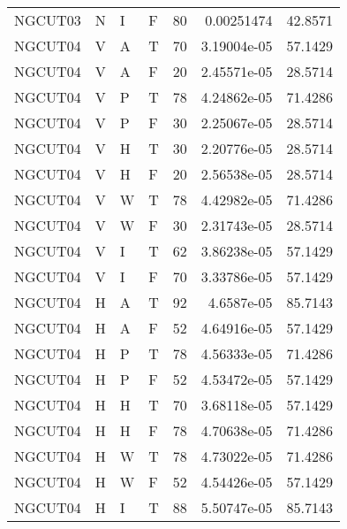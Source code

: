 \begin{longtable}{llllrrr}
    NGCUT03  & N         & I         & F          & 80         & 0.00251474  & 42.8571  \\
    NGCUT04  & V         & A         & T          & 70         & 3.19004e-05 & 57.1429  \\
    NGCUT04  & V         & A         & F          & 20         & 2.45571e-05 & 28.5714  \\
    NGCUT04  & V         & P         & T          & 78         & 4.24862e-05 & 71.4286  \\
    NGCUT04  & V         & P         & F          & 30         & 2.25067e-05 & 28.5714  \\
    NGCUT04  & V         & H         & T          & 30         & 2.20776e-05 & 28.5714  \\
    NGCUT04  & V         & H         & F          & 20         & 2.56538e-05 & 28.5714  \\
    NGCUT04  & V         & W         & T          & 78         & 4.42982e-05 & 71.4286  \\
    NGCUT04  & V         & W         & F          & 30         & 2.31743e-05 & 28.5714  \\
    NGCUT04  & V         & I         & T          & 62         & 3.86238e-05 & 57.1429  \\
    NGCUT04  & V         & I         & F          & 70         & 3.33786e-05 & 57.1429  \\
    NGCUT04  & H         & A         & T          & 92         & 4.6587e-05  & 85.7143  \\
    NGCUT04  & H         & A         & F          & 52         & 4.64916e-05 & 57.1429  \\
    NGCUT04  & H         & P         & T          & 78         & 4.56333e-05 & 71.4286  \\
    NGCUT04  & H         & P         & F          & 52         & 4.53472e-05 & 57.1429  \\
    NGCUT04  & H         & H         & T          & 70         & 3.68118e-05 & 57.1429  \\
    NGCUT04  & H         & H         & F          & 78         & 4.70638e-05 & 71.4286  \\
    NGCUT04  & H         & W         & T          & 78         & 4.73022e-05 & 71.4286  \\
    NGCUT04  & H         & W         & F          & 52         & 4.54426e-05 & 57.1429  \\
    NGCUT04  & H         & I         & T          & 88         & 5.50747e-05 & 85.7143  \\

\end{longtable}
